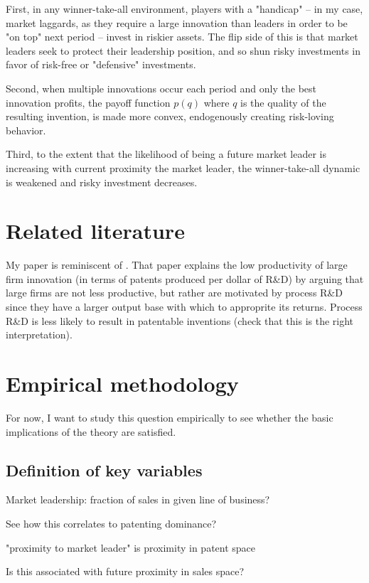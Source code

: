 \documentclass[12pt,english]{article}
\theoremstyle{remark}
\begin{document}
First, in any winner-take-all environment, players with a "handicap" -- in my case, market laggards, as they require a large innovation than leaders in order to be "on top" next period -- invest in riskier assets. The flip side of this is that market leaders seek to protect their leadership position, and so shun risky investments in favor of risk-free or "defensive" investments.

Second, when multiple innovations occur each period and only the best innovation profits, the payoff function $p(q)$ where $q$ is the quality of the resulting invention, is made more convex, endogenously creating risk-loving behavior.

Third, to the extent that the likelihood of being a future market leader is increasing with current proximity the market leader, the winner-take-all dynamic is weakened and risky investment decreases. 

\section{Related literature}

My paper is reminiscent of \cite{cohen_firm_1996}. That paper explains the low productivity of large firm innovation (in terms of patents produced per dollar of R\&D) by arguing that large firms are not less productive, but rather are motivated by process R\&D since they have a larger output base with which to approprite its returns. Process R\&D is less likely to result in patentable inventions (check that this is the right interpretation).

\section{Empirical methodology}

For now, I want to study this question empirically to see whether the basic implications of the theory are satisfied.

\subsection{Definition of key variables}

Market leadership: fraction of sales in given line of business?

See how this correlates to patenting dominance?

"proximity to market leader" is proximity in patent space

Is this associated with future proximity in sales space? 
\end{document}
